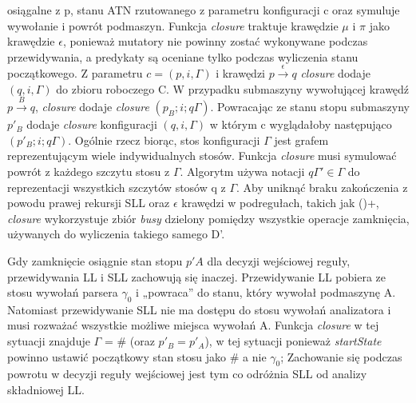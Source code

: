 osiągalne z p, stanu ATN rzutowanego z parametru konfiguracji c oraz symuluje wywołanie i powrót podmaszyn.
Funkcja \textit{closure} traktuje krawędzie $\mu$ i $\pi$ jako krawędzie $\epsilon$,
ponieważ mutatory nie powinny zostać wykonywane podczas przewidywania,
a predykaty są oceniane tylko podczas wyliczenia stanu początkowego.
Z parametru $c = (p, i, \Gamma)$ i krawędzi $p \overset{\epsilon}{\rightarrow} q$
\textit{closure} dodaje $(q, i, \Gamma)$ do zbioru roboczego C.
W przypadku submaszyny wywołującej krawędź $p \overset{B}{\rightarrow} q$,
\textit{closure} dodaje \textit{closure} $(p_B; i; q\Gamma)$.
Powracając ze stanu stopu submaszyny $p'_B$ dodaje \textit{closure} konfiguracji $(q, i, \Gamma)$
w którym c wyglądałoby następująco $(p'_B; i; q\Gamma)$.
Ogólnie rzecz biorąc, stos konfiguracji $\Gamma$ jest grafem reprezentującym wiele indywidualnych stosów.
Funkcja \textit{closure} musi symulować powrót z każdego szczytu stosu z $\Gamma$.
Algorytm używa notacji $q\Gamma' \in \Gamma$ do reprezentacji wszystkich szczytów stosów q z $\Gamma$.
Aby uniknąć braku zakończenia z powodu prawej rekursji SLL  oraz $\epsilon$ krawędzi w podregułach,
takich jak ()+, \textit{closure} wykorzystuje zbiór \textit{busy} dzielony pomiędzy
wszystkie operacje zamknięcia, używanych do wyliczenia takiego samego D'.
\par
Gdy zamknięcie osiągnie stan stopu $p'A$ dla decyzji wejściowej reguły,
przewidywania LL i SLL zachowują się inaczej. Przewidywanie LL pobiera ze stosu wywołań
parsera $\gamma_0$ i „powraca” do stanu, który wywołał podmaszynę A.
Natomiast przewidywanie SLL nie ma dostępu do stosu wywołań analizatora i musi
rozważać wszystkie możliwe miejsca wywołań A.
Funkcja \textit{closure} w tej sytuacji znajduje $\Gamma$ = \# (oraz $p'_B = p'_A$),
w tej sytuacji ponieważ \textit{startState} powinno ustawić początkowy stan stosu jako \#
a nie $\gamma_0$;
Zachowanie się podczas powrotu w decyzji reguły wejściowej jest tym co odróżnia SLL od analizy składniowej LL.
\par
